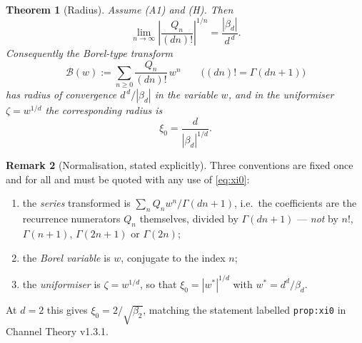 \documentclass[11pt]{article}
\newtheorem{theorem}{Theorem}
\theoremstyle{definition}
\newtheorem{remark}[theorem]{Remark}
\newcommand{\bd}{\beta_d}
\begin{document}
\begin{theorem}[Radius]\label{thm:radius}
Assume \textup{(A1)} and \textup{(H)}. Then
\begin{equation}\label{eq:radius}
\lim_{n\to\infty}\left|\frac{Q_n}{(dn)!}\right|^{1/n}=\frac{|\bd|}{d^{\,d}} .
\end{equation}
Consequently the Borel-type transform
\begin{equation}\label{eq:borel}
\mathcal{B}(w):=\sum_{n\ge0}\frac{Q_n}{(dn)!}\,w^n
\qquad\bigl((dn)!=\Gamma(dn+1)\bigr)
\end{equation}
has radius of convergence $d^{\,d}/|\bd|$ in the variable $w$, and in the
uniformiser $\zeta=w^{1/d}$ the corresponding radius is
\begin{equation}\label{eq:xi0}
\xi_0=\frac{d}{|\bd|^{1/d}} .
\end{equation}
\end{theorem}

\begin{remark}[Normalisation, stated explicitly]\label{rem:norm}
Three conventions are fixed once and for all and must be quoted with any use of
\eqref{eq:xi0}:
\begin{enumerate}
\item the \emph{series} transformed is $\sum_n Q_n w^n/\Gamma(dn+1)$, i.e.\ the
coefficients are the recurrence numerators $Q_n$ themselves, divided by
$\Gamma(dn+1)$ --- \emph{not} by $n!$, $\Gamma(n+1)$, $\Gamma(2n+1)$ or
$\Gamma(2n)$;
\item the \emph{Borel variable} is $w$, conjugate to the index $n$;
\item the \emph{uniformiser} is $\zeta=w^{1/d}$, so that $\xi_0=|w^*|^{1/d}$
with $w^*=d^d/\bd$.
\end{enumerate}
At $d=2$ this gives $\xi_0=2/\sqrt{\beta_2}$, matching the statement labelled
\texttt{prop:xi0} in Channel Theory v1.3.1.
\end{remark}
\end{document}
